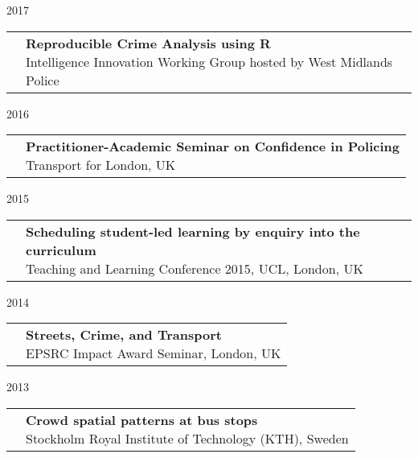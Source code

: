 \documentclass[10pt,a4paper,]{article}
\makeatletter
\def\briefitem#1#2#3{
#2 & \parbox[t]{0.85\textwidth}{%
      \textbf{#1}\\[-0.1cm]{\footnotesize #3}}\\[0.4cm]}
\def\briefsection#1{\begin{longtable}{@{\extracolsep{\fill}}ll}#1\end{longtable}}
\makeatother
\begin{document}
2017
\briefsection{\briefitem{Reproducible Crime Analysis using R}{}{Intelligence Innovation Working Group hosted by West Midlands Police}\briefitem{Building Interactive Data Visualizations}{}{Manchester Methods Fair, UK}\briefitem{Using open data in the social sciences}{}{Her+Data Meetup, Manchester, UK}\briefitem{What is Crowdsourced Data?}{}{Methods@Manchester seminar on research methods in social sciences, Manchester,UK}\briefitem{Eyes and Apps on the Street}{}{Stockholm Royal Institute of Technology (KTH), Sweden}\briefitem{Keynote: Making Sense of Data using Methods}{}{Methods North West Launch Conference, Manchester, UK}\briefitem{Using R for Crime Analysis}{}{Greater Manchester Police, Force HQ, Manchester, UK}\briefitem{Mapping   fear    of  crime   as  a   context-dependent   everyday    experience  that    varies  in  space   and time}{}{Horizon 2020 Project MARGIN conference, Budapest, Hungary}\briefitem{Using open data to evaluate current approaches to cabs tasking}{}{11th International Crime Science Conference, London, UK}\briefitem{Fighting Crime (and other bad things) on the transport network}{}{Manchester R User Group meetup}}

2016
\briefsection{\briefitem{Practitioner-Academic Seminar on Confidence in Policing}{}{Transport for London, UK}\briefitem{Policing and Public Confidence - Confidence at TfL and the challenges of a transport environment}{}{Public Confidence in the Police - University of Warwick, UK}}

2015
\briefsection{\briefitem{Scheduling student-led learning by enquiry into the curriculum}{}{Teaching and Learning Conference 2015, UCL, London, UK}\briefitem{Alternative Denominators in Transport Crime Rates}{}{Transport Statistics User Group Meeting, London, UK}\briefitem{Using a smartphone app to measure fear of crime on route 25}{}{Transport for London Route 25 Joint Transport Action Group (JTAG) meeting, London, UK}}

2014
\briefsection{\briefitem{Streets, Crime, and Transport}{}{EPSRC Impact Award Seminar, London, UK}\briefitem{A new approach to mapping perceptions of crime along the door-to-door journey}{}{Transport Geography Research Group Workshop, Leeds, UK}\briefitem{Fear of crime on transport}{}{PopFest, annual Population Studies conference for PhD students, London, UK}\briefitem{Using a smartphone app to report fear of hate crime}{}{Trans London Meetup, London, UK}}

2013
\briefsection{\briefitem{Crowd spatial patterns at bus stops}{}{Stockholm Royal Institute of Technology (KTH), Sweden}}
\end{document}
